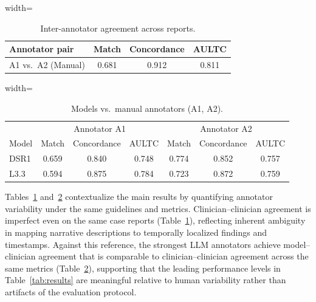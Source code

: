 \documentclass[pmlr,twocolumn,10pt]{jmlr} %
\begin{document}
\begin{table}[!ht]
\centering
\small
\caption{Inter-annotator agreement across reports.}
\label{tab:iaa_manual}
\begin{adjustbox}{width=\columnwidth}
\begin{tabular}{lccc}
\toprule
Annotator pair & Match & Concordance & AULTC \\
\midrule
A1 vs.\ A2 (Manual) & 0.681 & 0.912 & 0.811 \\
\bottomrule
\end{tabular}
\end{adjustbox}
\end{table}

\begin{table}[!ht]
\centering
\small
\caption{Models vs.\ manual annotators (A1, A2).}
\label{tab:iaa_models}
\begin{adjustbox}{width=\columnwidth}
\begin{tabular}{lccc|ccc}
\toprule
& \multicolumn{3}{c|}{Annotator A1} & \multicolumn{3}{c}{Annotator A2} \\
Model & Match & Concordance & AULTC & Match & Concordance & AULTC \\
\midrule
DSR1 & 0.659 & 0.840 & 0.748 & 0.774 & 0.852 & 0.757 \\
L3.3  & 0.594 & 0.875 & 0.784 & 0.723 & 0.872 & 0.759 \\
\bottomrule
\end{tabular}
\end{adjustbox}
\end{table}

Tables~\ref{tab:iaa_manual} and~\ref{tab:iaa_models} contextualize the main results by quantifying annotator variability under the same guidelines and metrics. Clinician--clinician agreement is imperfect even on the same case reports (Table~\ref{tab:iaa_manual}), reflecting inherent ambiguity in mapping narrative descriptions to temporally localized findings and timestamps. Against this reference, the strongest LLM annotators achieve model--clinician agreement that is comparable to clinician--clinician agreement across the same metrics (Table~\ref{tab:iaa_models}), supporting that the leading performance levels in Table~\ref{tab:results} are meaningful relative to human variability rather than artifacts of the evaluation protocol.
\end{document}
